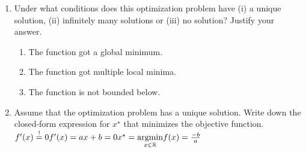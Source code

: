 %

\begin{enumerate}[label=(\alph*)]
	\item Under what conditions does this optimization problem have (i) a unique solution, (ii) infinitely many solutions or (iii) no solution? Justify your answer.
	\begin{enumerate}[label=(\roman*)]
		\item The function got a global minimum.
		\item The function got multiple local minima.
		\item The function is not bounded below.
	\end{enumerate}

	\item Assume that the optimization problem has a unique solution. Write down the closed-form expression for $x^\star$ that minimizes the objective function.
		\subitem $f^{\prime}(x)\stackrel{!}{=}0 \\ f^{\prime}(x) = ax + b = 0 \\ x^\star = \underset{x\in \mathbb{R}}{\operatorname{argmin}}f(x)= \frac{-b}{a}  $
\end{enumerate}
%
%

